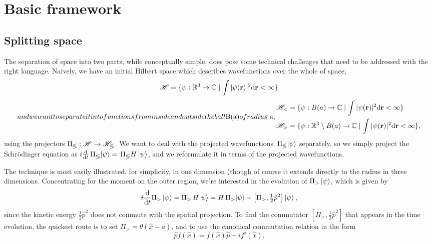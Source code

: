 \section{Basic framework}
\label{sec:basic-framework}

\subsection{Splitting space}


The separation of space into two parts, while conceptually simple, does pose some technical challenges that need to be addressed with the right language. Naively, we have an initial Hilbert space which describes wavefunctions over the whole of space,
\begin{equation}
\mathscr H=\{\psi:\mathbb R^3\to \mathbb C \mid \int|\psi(\vb{r})|^2 \mathrm{d}\vb{r} < \infty \}
\end{equation}
%
\begin{subequations}
%
and we want to separate it into functions from inside and outside the ball $B(a)$ of radius~$a$, 
\begin{align}
\hil_< & =\{\psi:B(a)\to \mathbb C \mid \int|\psi(\vbr)|^2 \d\vbr < \infty \} \\
\hil_> & =\{\psi:\mathbb R^3\setminus B(a)\to \mathbb C \mid \int|\psi(\vbr)|^2 \d\vbr < \infty \},
\end{align}
%
\end{subequations}
%
using the projectors $\Pi_\lessgtr:\mathscr H \to \mathscr H_\lessgtr$. We want to deal with the projected wavefunctions $\,\Pi_\lessgtr\! \ket\psi$ separately, so we simply project the Schrödinger equation as $i\frac{\mathrm{d}}{\mathrm{d} t} \,\Pi_\lessgtr\! \ket\psi=\,\Pi_\lessgtr  H \ket\psi$, and we reformulate it in terms of the projected wavefunctions. 

The technique is most easily illustrated, for simplicity, in one dimension (though of course it extends directly to the radius in three dimensions. Concentrating for the moment on the outer region, we're interested in the evolution of $\Pi_>\ket{\psi}$, which is given by
\begin{equation}
i\frac{\mathrm{d}}{\mathrm{d} t}\Pi_>\ket{\psi} 
= \Pi_> \,H\! \ket{\psi}
= H \,\Pi_> \!\ket{\psi} + \left[\Pi_>, \tfrac12\hat{p}^2\right]\ket{\psi},
\end{equation}
since the kinetic energy $\tfrac12\hat{p}^2$ does not commute with the spatial projection. To find the commutator $\left[\Pi_>, \tfrac12\hat{p}^2\right]$ that appears in the time evolution, the quickest route is to set $\Pi_> = \theta(\hat x-a)$, and to use the canonical commutation relation in the form
\begin{equation}
\hat{p} f(\hat{x}) = f(\hat{x}) \hat{p} -i f'(\hat{x}).
\end{equation}

